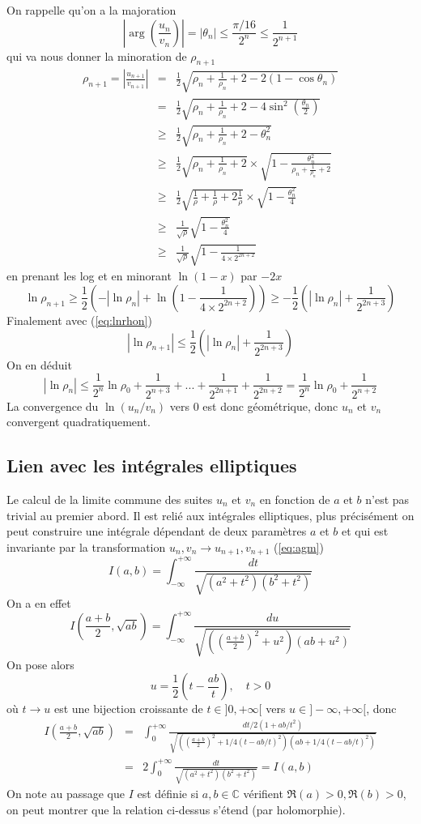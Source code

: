 \documentclass[a4paper,11pt]{article}
\newcommand{\C}{{\mathbb{C}}}
\begin{document}
On rappelle qu'on a la majoration 
\[ |\arg(\frac{u_n}{v_n})| = |\theta_n| \leq \frac{\pi/16}{2^n} \leq \frac{1}{2^{n+1}} \]
qui va nous donner la minoration de $\rho_{n+1}$ 
\begin{eqnarray*}
\rho_{n+1}=|\frac{u_{n+1}}{v_{n+1}}| & = & \frac{1}{2}
\sqrt{ \rho_n+ \frac{1}{\rho_n} +2 - 2 (1-\cos \theta_n) } \\
& = &  \frac{1}{2} \sqrt{ \rho_n+ \frac{1}{\rho_n} +2 - 4 \sin^2 (\frac{\theta_n}{2}) } \\
& \geq &  \frac{1}{2} \sqrt{ \rho_n+ \frac{1}{\rho_n} +2 - \theta_n^2} \\
& \geq &  \frac{1}{2} \sqrt{ \rho_n+ \frac{1}{\rho_n} +2} \times 
\sqrt{1 - \frac{\theta_n^2}{\rho_n+ \frac{1}{\rho_n} +2}} \\
& \geq &  \frac{1}{2} \sqrt{ \frac{1}{\rho} + \frac{1}{\rho} +2\frac{1}{\rho}} \times 
\sqrt{1 - \frac{\theta_n^2}{4}} \\
& \geq & \frac{1}{\sqrt{\rho}} \sqrt{1 - \frac{\theta_n^2}{4}} \\
& \geq & \frac{1}{\sqrt{\rho}} \sqrt{1 - \frac{1} {4 \times 2^{2n+2}}}
\end{eqnarray*}
en prenant les log et en minorant $\ln(1-x)$ par $-2x$
\[ \ln \rho_{n+1} \geq \frac{1}{2} (-|\ln \rho_n|+\ln(1 -\frac{1} {4 \times 2^{2n+2}} ))
\geq -\frac{1}{2} (|\ln \rho_n|+\frac{1} {2^{2n+3}} )  \]
Finalement avec (\ref{eq:lnrhon})
\[ |\ln \rho_{n+1}|
\leq \frac{1}{2} (|\ln \rho_n|+\frac{1}{2^{2n+3}} ) \]
On en déduit
\[ |\ln \rho_n| \leq \frac{1}{2^n} \ln \rho_0 + \frac{1}{2^{n+3}} + ... +
\frac{1}{2^{2n+1}} +  \frac{1}{2^{2n+2}}
= \frac{1}{2^n} \ln \rho_0 + \frac{1}{2^{n+2}} \]
La convergence du $\ln(u_n/v_n)$ vers 0 est donc géométrique, donc $u_n$ et $v_n$ convergent
quadratiquement.

\subsection{Lien avec les int\'egrales elliptiques}
Le calcul de la limite commune des suites $u_n$ et $v_n$ en fonction
de $a$ et $b$ n'est pas trivial
au premier abord. Il est reli\'e aux int\'egrales elliptiques, plus
pr\'ecis\'ement on peut construire une int\'egrale d\'ependant
de deux param\`etres $a$ et $b$ et qui est invariante par
la transformation $u_n,v_n \rightarrow u_{n+1},v_{n+1}$ (\ref{eq:agm})
\[ I(a,b)=\int_{-\infty}^{+\infty}  \frac{dt} {\sqrt{(a^2+t^2)(b^2+t^2)}}
\]
On a en effet
\[ I(\frac{a+b}{2},\sqrt{ab})
= \int_{-\infty}^{+\infty}  \frac{du}{\sqrt{((\frac{a+b}{2})^2+u^2)(ab+u^2)}} \]
On pose alors 
\[ u=\frac{1}{2} (t-\frac{ab}{t}), \quad t>0 \]
o\`u $t \rightarrow u$ est une bijection croissante de $t\in]0,+\infty[$ vers 
$u \in ]-\infty,+\infty[$, donc
\begin{eqnarray*}
I(\frac{a+b}{2},\sqrt{ab})
&=& \int_{0}^{+\infty}  \frac{dt/2(1+ab/t^2)}{\sqrt{((\frac{a+b}{2})^2+1/4(t-ab/t)^2)(ab+1/4(t-ab/t)^2)}}\\
&=& 2 \int_{0}^{+\infty} \frac{dt}{\sqrt{(a^2+t^2)(b^2+t^2)}}
= I(a,b)
\end{eqnarray*}
On note au passage que $I$ est définie si $a,b \in \C$ vérifient $\Re(a)>0, \Re(b)>0$,
on peut montrer que la relation ci-dessus s'étend (par holomorphie).
\end{document}
